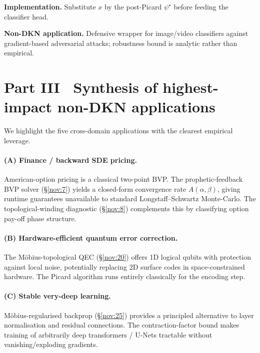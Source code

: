 \documentclass[11pt,a4paper]{article}
\theoremstyle{definition}
\newcommand{\contr}{A}
\begin{document}
\textbf{Implementation.} Substitute $x$ by the post-Picard $\psi^\star$
before feeding the classifier head.

\begin{tcolorbox}[applbox]
\textbf{Non-DKN application.}
Defensive wrapper for image/video classifiers against gradient-based
adversarial attacks; robustness bound is analytic rather than
empirical.
\end{tcolorbox}

\section{Part III \textemdash\ Synthesis of highest-impact non-DKN applications}
\label{sec:synthesis}

We highlight the five cross-domain applications with the clearest
empirical leverage.

\paragraph{(A) Finance / backward SDE pricing.}
American-option pricing is a classical two-point BVP. The
prophetic-feedback BVP solver (\S\ref{nov:7}) yields a closed-form
convergence rate $\contr(\alpha,\beta)$, giving runtime guarantees
unavailable to standard Longstaff--Schwartz Monte-Carlo. The
topological-winding diagnostic (\S\ref{nov:8}) complements this by
classifying option pay-off phase structure.

\paragraph{(B) Hardware-efficient quantum error correction.}
The M\"obius-topological QEC (\S\ref{nov:20}) offers 1D logical qubits
with protection against local noise, potentially replacing 2D surface
codes in space-constrained hardware. The Picard algorithm runs
entirely classically for the encoding step.

\paragraph{(C) Stable very-deep learning.}
M\"obius-regularised backprop (\S\ref{nov:25}) provides a principled
alternative to layer normalisation and residual connections. The
contraction-factor bound makes training of arbitrarily deep
transformers / U-Nets tractable without vanishing/exploding gradients.
\end{document}
